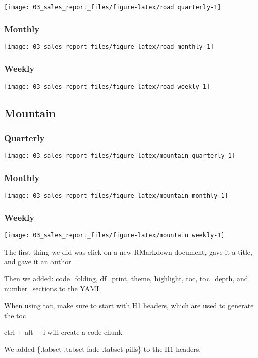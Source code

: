 \documentclass[
]{article}
\begin{document}
\texttt{[image: 03\_sales\_report\_files/figure-latex/road quarterly-1]}

\hypertarget{monthly}{%
\subsubsection{Monthly}\label{monthly}}

\texttt{[image: 03\_sales\_report\_files/figure-latex/road monthly-1]}

\hypertarget{weekly}{%
\subsubsection{Weekly}\label{weekly}}

\texttt{[image: 03\_sales\_report\_files/figure-latex/road weekly-1]}

\hypertarget{mountain}{%
\subsection{Mountain}\label{mountain}}

\hypertarget{quarterly-1}{%
\subsubsection{Quarterly}\label{quarterly-1}}

\texttt{[image: 03\_sales\_report\_files/figure-latex/mountain quarterly-1]}

\hypertarget{monthly-1}{%
\subsubsection{Monthly}\label{monthly-1}}

\texttt{[image: 03\_sales\_report\_files/figure-latex/mountain monthly-1]}

\hypertarget{weekly-1}{%
\subsubsection{Weekly}\label{weekly-1}}

\texttt{[image: 03\_sales\_report\_files/figure-latex/mountain weekly-1]}

The first thing we did was click on a new RMarkdown document, gave it a
title, and gave it an author

Then we added: code\_folding, df\_print, theme, highlight, toc,
toc\_depth, and number\_sections to the YAML

When using toc, make sure to start with H1 headers, which are used to
generate the toc

ctrl + alt + i will create a code chunk

We added \{.tabset .tabset-fade .tabset-pills\} to the H1 headers.
\end{document}
